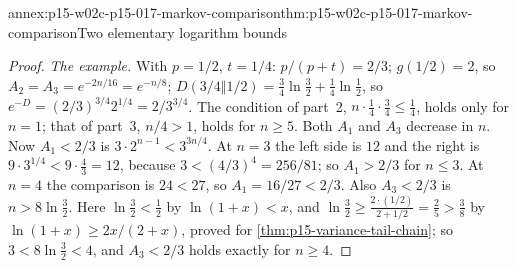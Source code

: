 \begin{annexitem}{annex:p15-w02c-p15-017-markov-comparison}{thm:p15-w02c-p15-017-markov-comparison}{Two elementary logarithm bounds}
\begin{proof}
\emph{The example.} With \(p=1/2\), \(t=1/4\): \(p/(p+t)=2/3\);
\(g(1/2)=2\), so \(A_2=A_3=e^{-2n/16}=e^{-n/8}\);
\(D(3/4\Vert1/2)=\tfrac34\ln\tfrac32+\tfrac14\ln\tfrac12\), so
\(e^{-D}=(2/3)^{3/4}2^{1/4}=2/3^{3/4}\). The condition of part~2,
\(n\cdot\tfrac14\cdot\tfrac34\leq\tfrac14\), holds only for \(n=1\); that
of part~3, \(n/4>1\), holds for \(n\geq5\). Both \(A_1\) and \(A_3\)
decrease in \(n\). Now \(A_1<2/3\) is \(3\cdot2^{n-1}<3^{3n/4}\). At
\(n=3\) the left side is \(12\) and the right is
\(9\cdot3^{1/4}<9\cdot\tfrac43=12\), because \(3<(4/3)^4=256/81\); so
\(A_1>2/3\) for \(n\leq3\). At \(n=4\) the comparison is \(24<27\), so
\(A_1=16/27<2/3\). Also \(A_3<2/3\) is \(n>8\ln\tfrac32\). Here \(\ln\tfrac32<\tfrac12\) by
\(\ln(1+x)<x\), and \(\ln\tfrac32\geq\tfrac{2\cdot(1/2)}{2+1/2}=\tfrac25>\tfrac38\)
by \(\ln(1+x)\geq2x/(2+x)\), proved for \cref{thm:p15-variance-tail-chain};
so \(3<8\ln\tfrac32<4\), and \(A_3<2/3\) holds exactly for \(n\geq4\).
\end{proof}
\end{annexitem}

